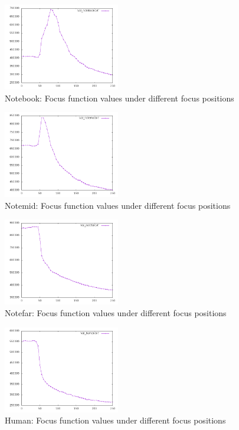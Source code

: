 \begin{figure}[tb!]
	\begin{center}
		\includegraphics[width=2in]{notebookplot}
	\end{center}
	\caption{Notebook: Focus function values under different focus positions}
	\label{f:notebookplot}
\end{figure}
\begin{figure}[tb!]
	\begin{center}
		\includegraphics[width=2in]{notemidplot}
	\end{center}
	\caption{Notemid: Focus function values under different focus positions}
	\label{f:notemidplot}
\end{figure}
\begin{figure}[tb!]
	\begin{center}
		\includegraphics[width=2in]{notefarplot}
	\end{center}
	\caption{Notefar: Focus function values under different focus positions}
	\label{f:notefarplot}
\end{figure}
\begin{figure}[tb!]
	\begin{center}
		\includegraphics[width=2in]{humanplot}
	\end{center}
	\caption{Human: Focus function values under different focus positions}
	\label{f:humanplot}
\end{figure}


